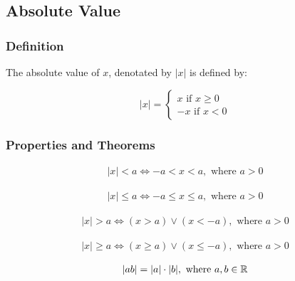 \subsection{Absolute Value}

\subsubsection{Definition}

The absolute value of $x$, denotated by $|x|$ is defined by:


\begin{equation}
  |x| =   \begin{cases}
            x \text{ if } x \geq 0 \\
            -x \text{ if } x < 0
          \end{cases}
\end{equation}

\subsubsection{Properties and Theorems}

\begin{equation}
  \begin{array}{c}
    |x| < a \iff -a < x < a, \text{ where } a > 0
  \end{array}
\end{equation}

\begin{equation}
  \begin{array}{c}
    |x| \leq a \iff -a \leq x \leq a, \text{ where } a > 0
  \end{array}
\end{equation}

\begin{equation}
  \begin{array}{c}
    |x| > a \iff (x > a) \lor (x < -a), \text{ where } a > 0
  \end{array}
\end{equation}

\begin{equation}
  \begin{array}{c}
    |x| \geq a \iff (x \geq a) \lor (x \leq -a), \text{ where } a > 0
  \end{array}
\end{equation}

\begin{equation}
  \begin{array}{c}
    |ab| = |a| \cdot |b|, \text{ where } a,b \in \mathbb{R}
  \end{array}
\end{equation}

